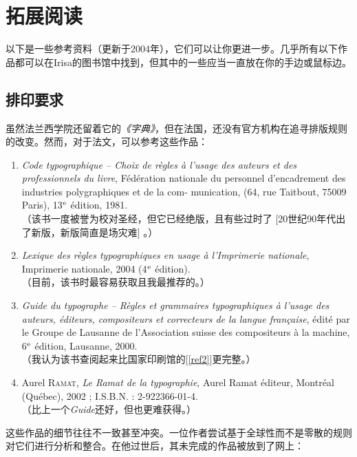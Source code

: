 \chapter{拓展阅读}

以下是一些参考资料（更新于2004年），它们可以让你更进一步。几乎所有以下作品都可以在Irisa的图书馆中找到，但其中的一些应当一直放在你的手边或鼠标边。

\section{排印要求}

虽然法兰西学院还留着它的\emph{《字典》}，但在法国，还没有官方机构在追寻排版规则的改变。然而，对于法文，可以参考这些作品：

\renewcommand{\labelenumi}{[\theenumi]}

\begin{enumerate}
    \item \emph{Code typographique – Choix de règles à l'usage des auteurs et des professionnels du livre}, Fédération nationale du personnel d'encadrement des industries polygraphiques et de la com- munication, (64, rue Taitbout, 75009 Paris), 13$^{\rm e}$ édition, 1981.\\
    （该书一度被誉为校对圣经，但它已经绝版，且有些过时了 [20世纪90年代出了新版，新版简直是场灾难] 。）
    \item \emph{Lexique des règles typographiques en usage à l'Imprimerie nationale}, Imprimerie nationale, 2004 (4$^{\rm e}$ édition).\\
    （目前，该书时最容易获取且我最推荐的。） \label{ref2}
    \item \emph{Guide du typographe -- Règles et grammaires typographiques à l'usage des auteurs, éditeurs, compositeurs et correcteurs de la langue française}, édité par le Groupe de Lausanne de l'Association suisse des compositeurs à la machine, 6$^{\rm e}$ édition, Lausanne, 2000.\\
    （我认为该书查阅起来比国家印刷馆的[\ref{ref2}]更完整。）
    \item Aurel \textsc{Ramat}, \emph{Le Ramat de la typographie}, Aurel Ramat éditeur, Montréal (Québec), 2002 ; I.S.B.N. : 2-922366-01-4.\\
    （比上一个\emph{Guide}还好，但也更难获得。）
\end{enumerate}

这些作品的细节往往不一致甚至冲突。一位作者尝试基于全球性而不是零散的规则对它们进行分析和整合。在他过世后，其未完成的作品被放到了网上：


